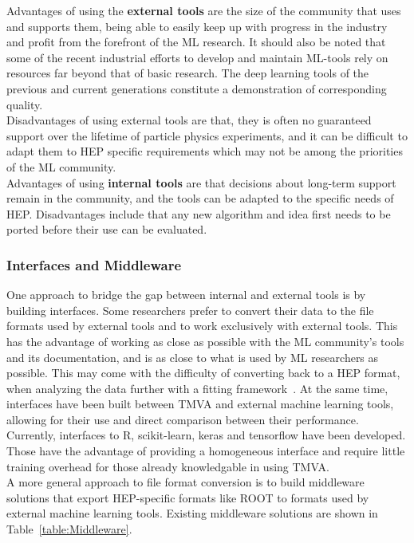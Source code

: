 Advantages of using the {\bf external tools} are the size of the community that uses and supports them, being able to easily keep up with progress in the industry and profit from the forefront of the ML research.
It should also be noted that some of the recent industrial efforts to develop and maintain ML-tools rely on resources far beyond that of basic research. The deep learning tools of the previous and current generations constitute a demonstration of corresponding quality.\\

Disadvantages of using external tools are that, they is often no guaranteed support over the lifetime of particle physics experiments, and it can be difficult to adapt them to HEP specific requirements which may not be among the priorities of the ML community.\\

Advantages of using {\bf internal tools} are that decisions about long-term support remain in the community, and the tools can be adapted to the specific needs of HEP. Disadvantages include that any new algorithm and idea first needs to be ported before their use can be evaluated.

\subsubsection{Interfaces and Middleware}

One approach to bridge the gap between internal and external tools is by building interfaces. Some researchers prefer to convert their data to the file formats used by external tools and to work exclusively with external tools. This has the advantage of working as close as possible with the ML community's tools and its documentation, and is as close to what is used by ML researchers as possible. This may come with the difficulty of converting back to a HEP format, when analyzing the data further with a fitting framework~\cite{RooFit, RooStats, HistFactory}.
At the same time, interfaces have been built between TMVA and external machine learning tools, allowing for their use and direct comparison between their performance. Currently, interfaces to R, scikit-learn, keras and tensorflow have been developed. Those have the advantage of providing a homogeneous interface and require little training overhead for those already knowledgable in using TMVA.\\

A more general approach to file format conversion is to build middleware solutions that export HEP-specific formats like ROOT to formats used by external machine learning tools.
Existing middleware solutions are shown in Table~\ref{table:Middleware}.\\


